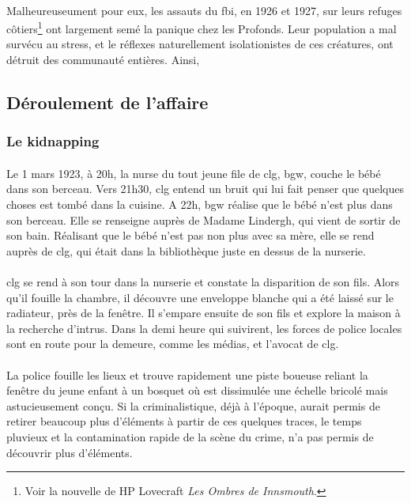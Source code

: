\paragraph{} Malheureuseument pour eux, les assauts du \gls{fbi}, en 1926 et 1927, sur leurs refuges côtiers\footnote{
Voir la nouvelle de HP Lovecraft \emph{Les Ombres de Innsmouth}.} ont largement semé la panique chez les Profonds. Leur
population a mal survécu au stress, et le réflexes naturellement isolationistes de ces créatures, ont détruit des 
communauté entières. Ainsi, 

\subsection{Déroulement de l'affaire}
\subsubsection{Le kidnapping}
\paragraph{} Le 1 mars 1923, à 20h, la nurse du tout jeune file de \gls{clg}, \gls{bgw}, couche le bébé dans son berceau. Vers 
21h30, \gls{clg} entend un bruit qui lui fait penser que quelques choses est tombé dans la cuisine. A 22h, \gls{bgw} réalise que
le bébé n'est plus dans son berceau. Elle se renseigne auprès de Madame Lindergh, qui vient de sortir de son bain. Réalisant que
le bébé n'est pas non plus avec sa mère, elle se rend auprès de \gls{clg}, qui était dans la bibliothèque juste en dessus de la
nurserie. 
\paragraph{} \gls{clg} se rend à son tour dans la nurserie et constate la disparition de son fils. Alors qu'il fouille la chambre,
il découvre une enveloppe blanche qui a été laissé sur le radiateur, près de la fenêtre. Il s'empare ensuite de son fils et explore 
la maison à la recherche d'intrus. Dans la demi heure qui suivirent, les forces de police locales sont en route pour la demeure,
comme les médias, et l'avocat de \gls{clg}.
\paragraph{} La police fouille les lieux et trouve rapidement une piste boueuse reliant la fenêtre du jeune enfant à un bosquet
où est dissimulée une échelle bricolé mais astucieusement conçu. Si la criminalistique, déjà à l'époque, aurait permis de retirer
beaucoup plus d'éléments à partir de ces quelques traces, le temps pluvieux et la contamination rapide de la scène du crime, n'a 
pas permis de découvrir plus d'éléments.  
